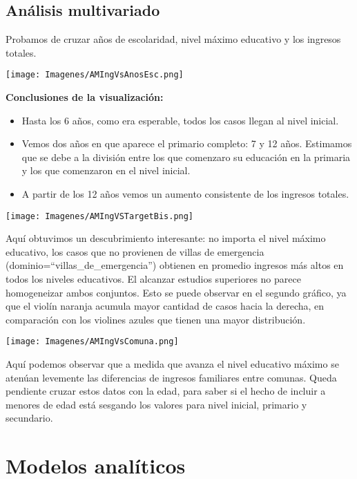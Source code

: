 \documentclass[a4paper]{article}
\begin{document}
    \subsection{Análisis multivariado}

        Probamos de cruzar años de escolaridad, nivel máximo educativo y los ingresos totales.

        \begin{center}
            \texttt{[image: Imagenes/AMIngVsAnosEsc.png]}
        \end{center}

        \textbf{Conclusiones de la visualización:}

        \begin{itemize}
            \item Hasta los 6 años, como era esperable, todos los casos llegan al nivel inicial.
            \item Vemos dos años en que aparece el primario completo: 7 y 12 años. Estimamos que se debe a la división entre los que comenzaro su educación en la primaria y los que comenzaron en el nivel inicial.
            \item A partir de los 12 años vemos un aumento consistente de los ingresos totales.
        \end{itemize}

        \begin{center}
            \texttt{[image: Imagenes/AMIngVSTargetBis.png]}
        \end{center}

        Aquí obtuvimos un descubrimiento interesante: no importa el nivel máximo educativo, los casos que no provienen de villas de emergencia (dominio=``villas\_de\_emergencia'') obtienen en promedio ingresos más altos en todos los niveles educativos. El alcanzar estudios superiores no parece homogeneizar ambos conjuntos. Esto se puede observar en el segundo gráfico, ya que el violín naranja acumula mayor cantidad de casos hacia la derecha, en comparación con los violines azules que tienen una mayor distribución.

        \begin{center}
            \texttt{[image: Imagenes/AMIngVsComuna.png]}
        \end{center}

        Aquí podemos observar que a medida que avanza el nivel educativo máximo se atenúan levemente las diferencias de ingresos familiares entre comunas. Queda pendiente cruzar estos datos con la edad, para saber si el hecho de incluir a menores de edad está sesgando los valores para nivel inicial, primario y secundario.


\section{Modelos analíticos}
\end{document}
